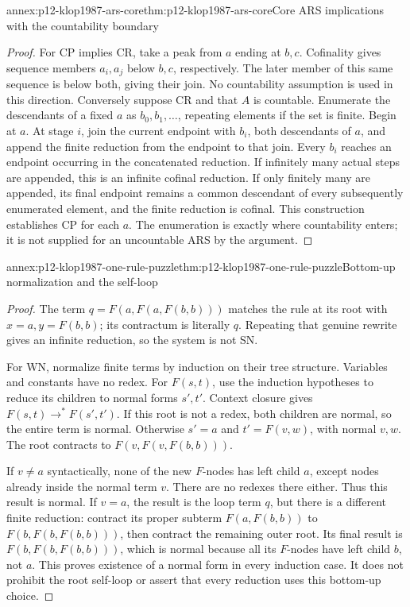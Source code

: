 \begin{annexitem}{annex:p12-klop1987-ars-core}{thm:p12-klop1987-ars-core}{Core ARS implications with the countability boundary}
\begin{proof}
For CP implies CR, take a peak from \(a\) ending at \(b,c\).
Cofinality gives sequence members \(a_i,a_j\) below \(b,c\),
respectively. The later member of this same sequence is below both,
giving their join. No countability assumption is used in this direction.
Conversely suppose CR and that \(A\) is countable. Enumerate the
descendants of a fixed \(a\) as \(b_0,b_1,\ldots\), repeating
elements if the set is finite. Begin at \(a\). At stage \(i\),
join the current endpoint with \(b_i\), both descendants of \(a\),
and append the finite reduction from the endpoint to that join. Every
\(b_i\) reaches an endpoint occurring in the concatenated reduction.
If infinitely many actual steps are appended, this is an infinite cofinal
reduction. If only finitely many are appended, its final endpoint remains
a common descendant of every subsequently enumerated element, and the
finite reduction is cofinal. This construction establishes CP for each
\(a\). The enumeration is exactly where countability enters; it is
not supplied for an uncountable ARS by the argument.
\end{proof}
\end{annexitem}

\begin{annexitem}{annex:p12-klop1987-one-rule-puzzle}{thm:p12-klop1987-one-rule-puzzle}{Bottom-up normalization and the self-loop}
\begin{proof}
The term \(q=F(a,F(a,F(b,b)))\) matches the rule at its root with
\(x=a,y=F(b,b)\); its contractum is literally \(q\). Repeating
that genuine rewrite gives an infinite reduction, so the system is not SN.

For WN, normalize finite terms by induction on their tree structure.
Variables and constants have no redex. For \(F(s,t)\), use the
induction hypotheses to reduce its children to normal forms \(s',t'\).
Context closure gives \(F(s,t)\to^*F(s',t')\). If this root is
not a redex, both children are normal, so the entire term is normal.
Otherwise \(s'=a\) and \(t'=F(v,w)\), with normal \(v,w\).
The root contracts to \(F(v,F(v,F(b,b)))\).

If \(v\ne a\) syntactically, none of the new \(F\)-nodes has
left child \(a\), except nodes already inside the normal term \(v\).
There are no redexes there either. Thus this result is normal.
If \(v=a\), the result is the loop term \(q\), but there is a
different finite reduction: contract its proper subterm
\(F(a,F(b,b))\) to \(F(b,F(b,F(b,b)))\), then contract the
remaining outer root. Its final result is
\(F(b,F(b,F(b,b)))\), which is normal because all its \(F\)-nodes
have left child \(b\), not \(a\).
This proves existence of a normal form in every induction case.
It does not prohibit the root self-loop or assert that every reduction
uses this bottom-up choice.
\end{proof}
\end{annexitem}

